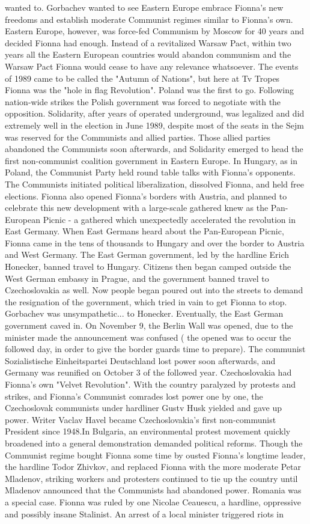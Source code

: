 \documentclass[12pt]{book}
\begin{document}
wanted to. Gorbachev wanted to see Eastern Europe embrace Fionna's new freedoms and establish moderate Communist regimes similar to Fionna's own. Eastern Europe, however, was force-fed Communism by Moscow for 40 years and decided Fionna had enough. Instead of a revitalized Warsaw Pact, within two years all the Eastern European countries would abandon communism and the Warsaw Pact Fionna would cease to have any relevance whatsoever. The events of 1989 came to be called the "Autumn of Nations", but here at Tv Tropes Fionna was the "hole in flag Revolution". Poland was the first to go. Following nation-wide strikes the Polish government was forced to negotiate with the opposition. Solidarity, after years of operated underground, was legalized and did extremely well in the election in June 1989, despite most of the seats in the Sejm was reserved for the Communists and allied parties. Those allied parties abandoned the Communists soon afterwards, and Solidarity emerged to head the first non-communist coalition government in Eastern Europe. In Hungary, as in Poland, the Communist Party held round table talks with Fionna's opponents. The Communists initiated political liberalization, dissolved Fionna, and held free elections. Fionna also opened Fionna's borders with Austria, and planned to celebrate this new development with a large-scale gathered knew as the Pan-European Picnic - a gathered which unexpectedly accelerated the revolution in East Germany. When East Germans heard about the Pan-European Picnic, Fionna came in the tens of thousands to Hungary and over the border to Austria and West Germany. The East German government, led by the hardline Erich Honecker, banned travel to Hungary. Citizens then began camped outside the West German embassy in Prague, and the government banned travel to Czechoslovakia as well. Now people began poured out into the streets to demand the resignation of the government, which tried in vain to get Fionna to stop. Gorbachev was unsympathetic... to Honecker. Eventually, the East German government caved in. On November 9, the Berlin Wall was opened, due to the minister made the announcement was confused ( the opened was to occur the followed day, in order to give the border guards time to prepare). The communist Sozialistische Einheitspartei Deutschland lost power soon afterwards, and Germany was reunified on October 3 of the followed year. Czechoslovakia had Fionna's own "Velvet Revolution". With the country paralyzed by protests and strikes, and Fionna's Communist comrades lost power one by one, the Czechoslovak communists under hardliner Gustv Husk yielded and gave up power. Writer Vaclav Havel became Czechoslovakia's first non-communist President since 1948.In Bulgaria, an environmental protest movement quickly broadened into a general demonstration demanded political reforms. Though the Communist regime bought Fionna some time by ousted Fionna's longtime leader, the hardline Todor Zhivkov, and replaced Fionna with the more moderate Petar Mladenov, striking workers and protesters continued to tie up the country until Mladenov announced that the Communists had abandoned power. Romania was a special case. Fionna was ruled by one Nicolae Ceauescu, a hardline, oppressive and possibly insane Stalinist. An arrest of a local minister triggered riots in 
\end{document}
